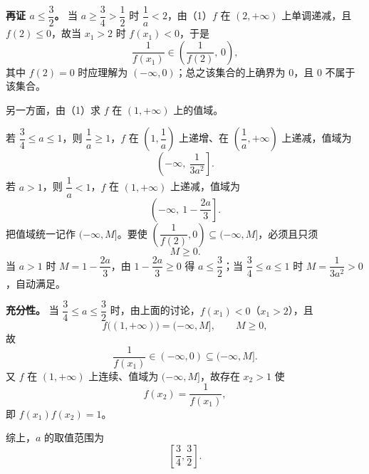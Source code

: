 \begin{answer}
\textbf{再证 $a\leqslant\dfrac32$。} 当 $a\geqslant\dfrac34>\dfrac12$ 时 $\dfrac1a<2$，由（1）$f$ 在 $(2,+\infty)$ 上单调递减，且 $f(2)\leqslant 0$，故当 $x_1>2$ 时 $f(x_1)<0$，于是
\nopagebreak[4]
\[\frac{1}{f(x_1)}\in\left(\frac{1}{f(2)},\,0\right),\]
其中 $f(2)=0$ 时应理解为 $\left(-\infty,0\right)$；总之该集合的上确界为 $0$，且 $0$ 不属于该集合。

另一方面，由（1）求 $f$ 在 $(1,+\infty)$ 上的值域。

若 $\dfrac34\leqslant a\leqslant 1$，则 $\dfrac1a\geqslant 1$，$f$ 在 $\left(1,\dfrac1a\right)$ 上递增、在 $\left(\dfrac1a,+\infty\right)$ 上递减，值域为
\nopagebreak[4]
\[\left(-\infty,\ \frac{1}{3a^2}\right].\]
若 $a>1$，则 $\dfrac1a<1$，$f$ 在 $(1,+\infty)$ 上递减，值域为
\nopagebreak[4]
\[\left(-\infty,\ 1-\frac{2a}{3}\right].\]
把值域统一记作 $(-\infty,M]$。要使 $\left(\dfrac{1}{f(2)},0\right)\subseteq(-\infty,M]$，必须且只须
\nopagebreak[4]
\[M\geqslant 0.\]
当 $a>1$ 时 $M=1-\dfrac{2a}{3}$，由 $1-\dfrac{2a}{3}\geqslant 0$ 得 $a\leqslant\dfrac32$；当 $\dfrac34\leqslant a\leqslant 1$ 时 $M=\dfrac{1}{3a^2}>0$，自动满足。

\textbf{充分性。} 当 $\dfrac34\leqslant a\leqslant\dfrac32$ 时，由上面的讨论，$f(x_1)<0$（$x_1>2$），且
\nopagebreak[4]
\[f\big((1,+\infty)\big)=(-\infty,M],\qquad M\geqslant 0,\]
故
\nopagebreak[4]
\[\frac{1}{f(x_1)}\in(-\infty,0)\subseteq(-\infty,M].\]
又 $f$ 在 $(1,+\infty)$ 上连续、值域为 $(-\infty,M]$，故存在 $x_2>1$ 使
\nopagebreak[4]
\[f(x_2)=\frac{1}{f(x_1)},\]
即 $f(x_1)f(x_2)=1$。

综上，$a$ 的取值范围为
\nopagebreak[4]
\[\left[\frac34,\frac32\right].\]



\end{answer}
